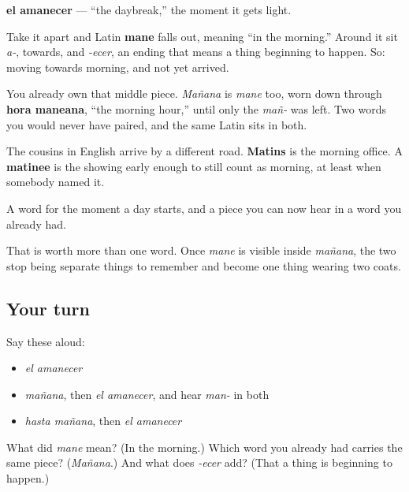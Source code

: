 \begin{cousinweb}
\textbf{el amanecer} — \textquotedblleft{}the daybreak,\textquotedblright{} the moment it gets light.

Take it apart and Latin \textbf{mane} falls out, meaning \textquotedblleft{}in the morning.\textquotedblright{} Around it sit \emph{a-}, towards, and \emph{-ecer}, an ending that means a thing beginning to happen. So: moving towards morning, and not yet arrived.

You already own that middle piece. \emph{Mañana} is \emph{mane} too, worn down through \textbf{hora maneana}, \textquotedblleft{}the morning hour,\textquotedblright{} until only the \emph{mañ-} was left. Two words you would never have paired, and the same Latin sits in both.

The cousins in English arrive by a different road. \textbf{Matins} is the morning office. A \textbf{matinee} is the showing early enough to still count as morning, at least when somebody named it.
\end{cousinweb}

\begin{grammarlens}[title={What you've built}]
A word for the moment a day starts, and a piece you can now hear in a word you already had.

That is worth more than one word. Once \emph{mane} is visible inside \emph{mañana}, the two stop being separate things to remember and become one thing wearing two coats.
\end{grammarlens}

\subsection*{Your turn}
Say these aloud:

\begin{itemize}
\raggedright
  \item \emph{el amanecer}
  \item \emph{mañana}, then \emph{el amanecer}, and hear \emph{man-} in both
  \item \emph{hasta mañana}, then \emph{el amanecer}
\end{itemize}

\begin{tcolorbox}[breakable,colback=teal!4,colframe=teal!35!black,title={Before you move on}]
What did \emph{mane} mean? (In the morning.) Which word you already had carries the same piece? (\emph{Mañana}.) And what does \emph{-ecer} add? (That a thing is beginning to happen.)
\end{tcolorbox}

